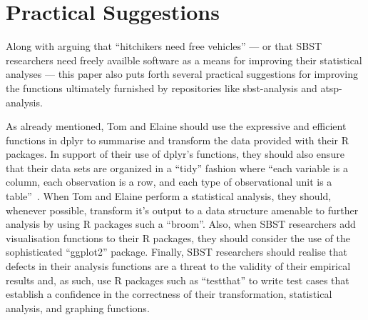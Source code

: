 
\vspace*{-.5em}

\section{Practical Suggestions}
\label{sec:suggestions}


Along with arguing that ``hitchikers need free vehicles'' --- or that SBST researchers need freely availble software as
a means for improving their statistical analyses --- this paper also puts forth several practical suggestions for
improving the functions ultimately furnished by repositories like sbst-analysis and atsp-analysis.

As already mentioned, Tom and Elaine should use the expressive and efficient functions in dplyr to summarise and
transform the data provided with their R packages. In support of their use of dplyr's functions, they should also ensure
that their data sets are organized in a ``tidy'' fashion where ``each variable is a column, each observation is a row,
and each type of observational unit is a table''~\cite{Wickham2014}. When Tom and Elaine perform a statistical analysis,
they should, whenever possible, transform it's output to a data structure amenable to further analysis by using R
packages such a ``broom''. Also, when SBST researchers add visualisation functions to their R packages, they should
consider the use of the sophisticated ``ggplot2'' package. Finally, SBST researchers should realise that defects in
their analysis functions are a threat to the validity of their empirical results and, as such, use R packages such as
``testthat'' to write test cases that establish a confidence in the correctness of their transformation, statistical
analysis, and graphing functions.


